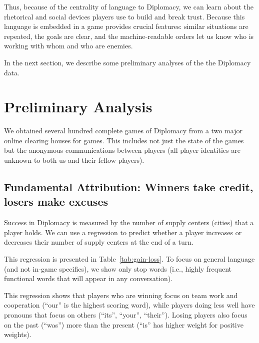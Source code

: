 \documentclass[11pt,letterpaper]{article}
\begin{document}
Thus, because of the centrality of language to Diplomacy, we can learn
about the rhetorical and social devices players use to build and break
trust.  Because this language is embedded in a game provides crucial
features: similar situations are repeated, the goals are clear, and
the machine-readable orders let us know who is working with whom and
who are enemies.

In the next section, we describe some preliminary analyses of the the
Diplomacy data.

\section{Preliminary Analysis}

We obtained several hundred complete games of Diplomacy from a two
major online clearing houses for games.  This includes not just the
state of the games but the anonymous communications between players
(all player identities are unknown to both us and their fellow
players).

\subsection{Fundamental Attribution: Winners take credit, losers make excuses}

Success in Diplomacy is measured by the number of supply centers
(cities) that a player holds.  We can use a regression to predict
whether a player increases or decreases their number of supply centers
at the end of a turn.

This regression is presented in Table~\ref{tab:gain-loss}.  To focus
on general language (and not in-game specifics), we show only stop
words (i.e., highly frequent functional words that will appear in any
conversation).

This regression shows that players who are winning focus on team work
and cooperation (``our'' is the highest scoring word), while players
doing less well have pronouns that focus on others (``its'', ``your'',
``their'').  Losing players also focus on the past (``was'') more than
the present (``is'' has higher weight for positive weights).
\end{document}
